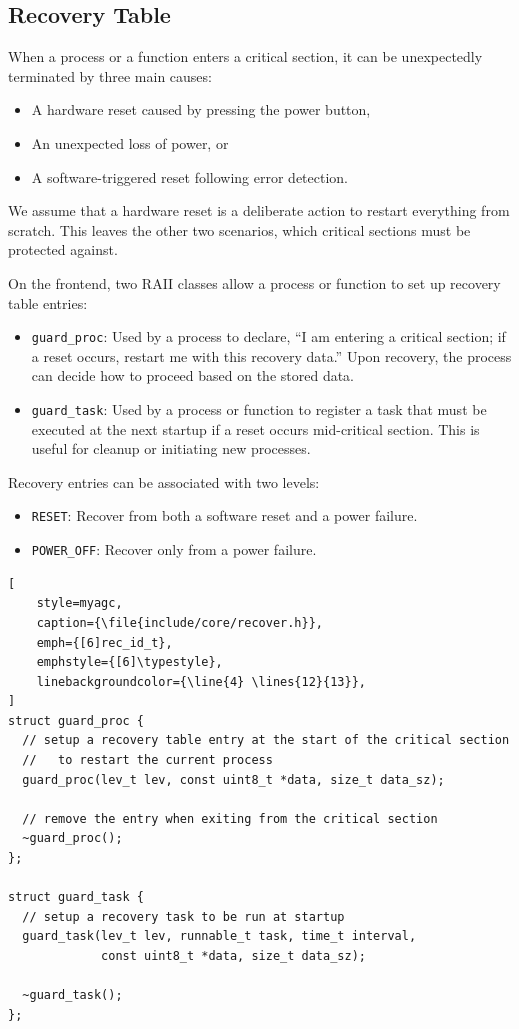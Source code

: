 \subsection{Recovery Table}
\label{sec:rec_tbl}

When a process or a function enters a critical section, it can be unexpectedly
terminated by three main causes:
\begin{itemize}
    \item A hardware reset caused by pressing the power button,
    \item An unexpected loss of power, or
    \item A software-triggered reset following error detection.
\end{itemize}
We assume that a hardware reset is a deliberate action to restart everything from
scratch. This leaves the other two scenarios, which critical sections must be protected
against.

On the frontend, two RAII classes allow a process or function to set up recovery table
entries:
\begin{itemize}
    \item \lstinline[style=myagc]|guard_proc|: Used by a process to declare, ``I am
        entering a critical section; if a reset occurs, restart me with this recovery
        data.'' Upon recovery, the process can decide how to proceed based on the stored
        data.
    \item \lstinline[style=myagc]|guard_task|: Used by a process or function to register
        a task that must be executed at the next startup if a reset occurs mid-critical
        section. This is useful for cleanup or initiating new processes.
\end{itemize}

Recovery entries can be associated with two levels:
\begin{itemize}
    \item \lstinline[style=myagc]|RESET|: Recover from both a software reset and a power
        failure.
    \item \lstinline[style=myagc]|POWER_OFF|: Recover only from a power failure.
\end{itemize}

\begin{lstlisting}[
    style=myagc,
    caption={\file{include/core/recover.h}},
    emph={[6]rec_id_t},
    emphstyle={[6]\typestyle},
    linebackgroundcolor={\line{4} \lines{12}{13}},
]
struct guard_proc {
  // setup a recovery table entry at the start of the critical section
  //   to restart the current process 
  guard_proc(lev_t lev, const uint8_t *data, size_t data_sz);

  // remove the entry when exiting from the critical section
  ~guard_proc();
};

struct guard_task {
  // setup a recovery task to be run at startup 
  guard_task(lev_t lev, runnable_t task, time_t interval,
             const uint8_t *data, size_t data_sz);

  ~guard_task();
};
\end{lstlisting}

